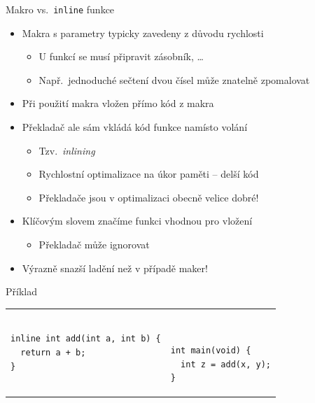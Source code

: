 \begin{frame}[fragile]{Makro vs.\ \texttt{inline} funkce}

  \begin{itemize}
    \item Makra s parametry typicky zavedeny z důvodu rychlosti
    \begin{itemize}
      \item U funkcí se musí připravit zásobník, \dots
      \item Např.\ jednoduché sečtení dvou čísel může znatelně zpomalovat
    \end{itemize}

    \pause

    \item Při použití makra vložen přímo kód z makra

    \pause

    \item Překladač ale sám vkládá kód funkce namísto volání
    \begin{itemize}
      \item Tzv.\ \textit{inlining}
      \item Rychlostní optimalizace na úkor paměti -- delší kód
      \item Překladače jsou v optimalizaci obecně velice dobré!
    \end{itemize}

    \pause

    \item Klíčovým slovem  značíme funkci vhodnou pro vložení
    \begin{itemize}
      \item Překladač může ignorovat
    \end{itemize}

    \pause

    \item Výrazně snazší ladění než v případě maker!

  \end{itemize}


\begin{block}{Příklad}
\begin{tabular}{ll}
\begin{lstlisting}
inline int add(int a, int b) {
  return a + b;
}
\end{lstlisting}
& ~~~~~~~~~~
\begin{lstlisting}
int main(void) {
  int z = add(x, y);
}
\end{lstlisting}
\end{tabular}
\end{block}

\end{frame}

